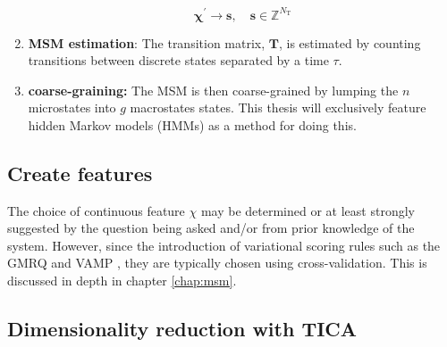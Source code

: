 \begin{enumerate}
    \begin{equation*}
        \bm{\chi}^{\prime} \rightarrow \mathbf{s},\quad \mathbf{s} \in \mathbb{Z}^{N_{\mathrm{T}}}
    \end{equation*}\label{step:cluster}
    \item \textbf{MSM estimation}: The transition matrix, $\mathbf{T}$, is estimated by counting transitions between discrete states separated by a time $\tau$. 
    \item \textbf{coarse-graining:} The MSM is then coarse-grained by lumping the $n$ microstates into $g$ macrostates states. This thesis will exclusively feature hidden Markov models (HMMs) as a method for doing this. 
\end{enumerate}

\subsection{Create features}
The choice of continuous feature $\chi$ may be determined or at least strongly suggested by the question being asked and/or from prior knowledge of the system. However, since the introduction of variational scoring rules such as the GMRQ \cite{mcgibbonVariationalCrossvalidationSlow2015} and VAMP \cite{wuVariationalApproachLearning2020c}, they are typically chosen using cross-validation. This is discussed in depth in chapter \ref{chap:msm}. 

\subsection{Dimensionality reduction with TICA}


